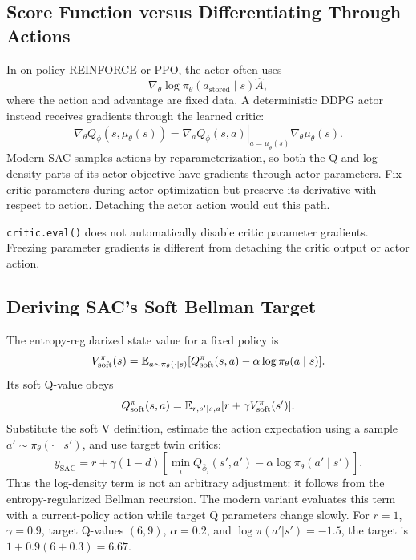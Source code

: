 \subsection{Score Function versus Differentiating Through Actions}
In on-policy REINFORCE or PPO, the actor often uses
\begin{equation}
\nabla_\theta\log\pi_\theta(a_{\mathrm{stored}}\mid s)\hat A,
\end{equation}
where the action and advantage are fixed data. A deterministic DDPG actor instead receives gradients through the learned critic:
\begin{equation}
\nabla_\theta Q_\phi(s,\mu_\theta(s))=
\left.\nabla_a Q_\phi(s,a)\right|_{a=\mu_\theta(s)}
\nabla_\theta\mu_\theta(s).
\end{equation}
Modern SAC samples actions by reparameterization, so both the Q and log-density parts of its actor objective have gradients through actor parameters. Fix critic parameters during actor optimization but preserve its derivative with respect to action. Detaching the actor action would cut this path.
\begin{pitfall}
\texttt{critic.eval()} does not automatically disable critic parameter gradients. Freezing parameter gradients is different from detaching the critic output or actor action.
\end{pitfall}

\subsection{Deriving SAC's Soft Bellman Target}
The entropy-regularized state value for a fixed policy is
\begin{equation}
V^\pi_{\mathrm{soft}}(s)
=\mathbb{E}_{a\sim\pi_\theta(\cdot\mid s)}
[Q^\pi_{\mathrm{soft}}(s,a)-\alpha\log\pi_\theta(a\mid s)].
\end{equation}
Its soft Q-value obeys
\begin{equation}
Q^\pi_{\mathrm{soft}}(s,a)
=\mathbb{E}_{r,s'\mid s,a}[r+\gamma V^\pi_{\mathrm{soft}}(s')].
\end{equation}
Substitute the soft V definition, estimate the action expectation using a sample $a'\sim\pi_\theta(\cdot\mid s')$, and use target twin critics:
\begin{equation}
y_{\mathrm{SAC}}=r+\gamma(1-d)
[\min_iQ_{\bar\phi_i}(s',a')-\alpha\log\pi_\theta(a'\mid s')].
\end{equation}
Thus the log-density term is not an arbitrary adjustment: it follows from the entropy-regularized Bellman recursion. The modern variant evaluates this term with a current-policy action while target Q parameters change slowly.
For $r=1$, $\gamma=0.9$, target Q-values $(6,9)$, $\alpha=0.2$, and $\log\pi(a'|s')=-1.5$, the target is $1+0.9(6+0.3)=6.67$.

